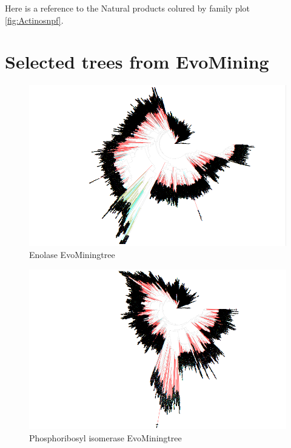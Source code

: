 \documentclass[12pt,twoside]{reedthesis}
\begin{document}
  Here is a reference to the Natural products colured by family plot
  \autoref{fig:Actinosnpf}. \clearpage 
  
  \section{Selected trees from
  EvoMining}\label{selected-trees-from-evomining-1}
  
  \begin{figure}[h!tbp]
  \centering
  \includegraphics[angle = 180,scale = 0.3]{chapter2/Actinobacteria/tree15.png}
  \caption[Enolase EvoMiningtree]{\normalsize{Enolase EvoMiningtree}}
  \label{fig:enolase_evo_tree}
  \end{figure}\begin{figure}[h!tbp]
  \centering
  \includegraphics[angle = 180,scale = 0.3]{chapter2/Actinobacteria/tree73.png}
  \caption[Phosphoribosyl isomerase EvoMiningtree]{\normalsize{Phosphoribosyl isomerase EvoMiningtree}}
  \label{fig:Phosphoribosyl_isomerase_evo_tree}

\end{figure}
\end{document}
